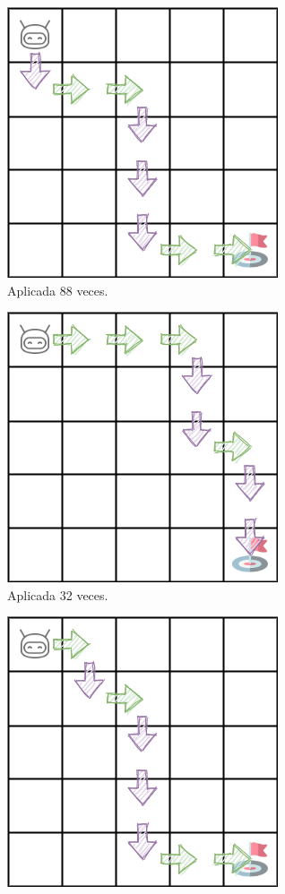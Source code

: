 \begin{figure}
\begin{subfigure}{.3\textwidth}
        \centering
        \includegraphics[scale=0.35]{cap5_experimentacion/images/dim5_lr0.01_ep0.7_88.png}
        \caption{Aplicada 88 veces.}
        \label{fig:dim5_lr0.01_ep0.7_88}
    \end{subfigure}
    \begin{subfigure}{.3\textwidth}
        \centering
        \includegraphics[scale=0.35]{cap5_experimentacion/images/dim5_lr0.01_ep0.7_32.png}
        \caption{Aplicada 32 veces.}
        \label{fig:dim5_lr0.01_ep0.7_32}
    \end{subfigure}%
    \begin{subfigure}{.3\textwidth}
        \centering
        \includegraphics[scale=0.35]{cap5_experimentacion/images/dim5_lr0.01_ep0.7_30.png}

\end{subfigure}
\end{figure}
